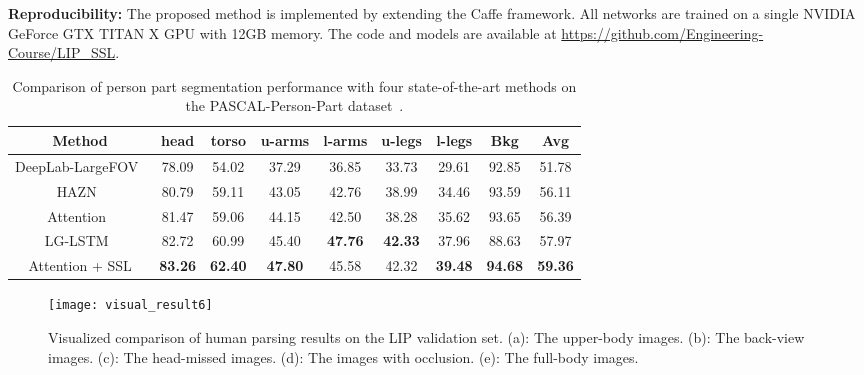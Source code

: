 \documentclass[10pt,twocolumn,letterpaper]{article}
\begin{document}
\textbf{Reproducibility:}
The proposed method is implemented by extending the Caffe framework. All networks are trained on a single NVIDIA GeForce GTX TITAN X GPU with 12GB memory. The code and
models are available at \url{https://github.com/Engineering-Course/LIP_SSL}.

\begin{table}[]
\centering
\scriptsize
\tabcolsep 0.025in 
\begin{tabular}{ccccccccc}
\toprule[0.7pt]
   Method                                     &  head  &  torso  &  u-arms &  l-arms &  u-legs &  l-legs &  Bkg   &  Avg    \\ \hline
   DeepLab-LargeFOV~\cite{chen2014semantic}      & 78.09  &  54.02  &  37.29  &  36.85  &  33.73  &  29.61  &  92.85 &  51.78  \\
   HAZN~\cite{xia2015zoom}                       & 80.79  &  59.11  &  43.05  &  42.76  &  38.99  &  34.46  &  93.59 &  56.11  \\  
   Attention~\cite{chen2015attention}   & 81.47  &  59.06  &  44.15  &  42.50  &  38.28  &  35.62  &  93.65 &  56.39  \\ 
   LG-LSTM~\cite{liang2015semantic}              & 82.72  &  60.99  &  45.40  &  \textbf{47.76}  &  \textbf{42.33}  &  37.96  &  88.63 &  57.97  \\ \hline    
   Attention + SSL                      & \textbf{83.26}  &  \textbf{62.40}  &  \textbf{47.80}  &  45.58  &  42.32 &  \textbf{39.48}  &  \textbf{94.68} 
                                        &  \textbf{59.36}   \\
\toprule[0.7pt]
\end{tabular}
\vspace{-4mm}
\caption{Comparison of person part segmentation performance with four state-of-the-art methods on the PASCAL-Person-Part dataset~\cite{chen2014detect}.}
\vspace{-6mm}
\label{tab: pascal}
\end{table}

\begin{figure*}[t]
\centering
\texttt{[image: visual\_result6]}
\vspace{-4mm}
\caption{Visualized comparison of human parsing results on the LIP validation set. (a): The upper-body images. (b): The back-view images. (c): The head-missed images. (d): The images with occlusion. (e): The full-body images.}
\vspace{-6mm}
\label{fig:Comparison}
\end{figure*}
\end{document}
